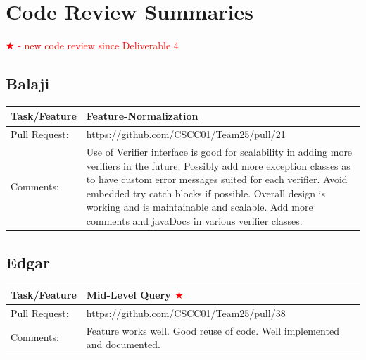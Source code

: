 \documentclass[12pt]{article}
\begin{document}
\section{Code Review Summaries}

\textcolor{red}{$\bigstar$ - new code review since Deliverable 4}

\subsection{Balaji} 
\begin{table}[H]
\begin{tabular}{|p{3cm}|p{11cm}|}
\hline
Task/Feature  & Feature-Normalization                                                                                                                                                                                                                                                                                                                                         \\ \hline
Pull Request: & \url{https://github.com/CSCC01/Team25/pull/21}                                                                                                                                                                                                                                                                                                                      \\ \hline
Comments:     & Use of Verifier interface is good for scalability in adding more verifiers in the future. Possibly add more exception classes as to have custom error messages suited for each verifier. Avoid embedded try catch blocks if possible. Overall design is working and is maintainable and scalable. Add more comments and javaDocs in various verifier classes. \\ \hline
\end{tabular}
\end{table}


\subsection{Edgar}
\begin{table}[H]
\begin{tabular}{|p{3cm}|p{11cm}|}
\hline
Task/Feature  & Mid-Level Query \textcolor{red}{$\bigstar$}
 \\ \hline
Pull Request: & \url{https://github.com/CSCC01/Team25/pull/38}                                                                                                                                                                                                                                                                                                                      \\ \hline
Comments:     & Feature works well. Good reuse of code. Well implemented and documented.
 \\ \hline
\end{tabular}
\end{table}
\end{document}
